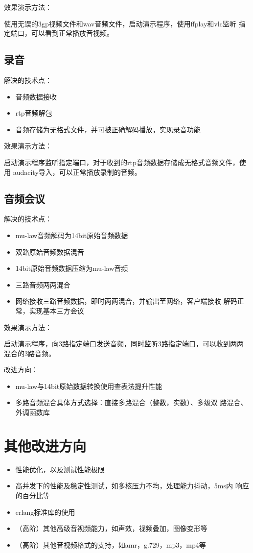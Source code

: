\documentclass[11pt]{article}
\begin{document}
    效果演示方法：
        
        使用无误的3gp视频文件和wav音频文件，启动演示程序，使用ffplay和vlc监听
        指定端口，可以看到正常播放音视频。

\subsection{录音}
    解决的技术点：
    \begin{itemize}
        \item 音频数据接收
        \item rtp音频解包
        \item 音频存储为无格式文件，并可被正确解码播放，实现录音功能
    \end{itemize}

    效果演示方法：
        
    启动演示程序监听指定端口，对于收到的rtp音频数据存储成无格式音频文件，使用
    audacity导入，可以正常播放录制的音频。

\subsection{音频会议}
    解决的技术点：
    \begin{itemize}
        \item mu-law音频解码为14bit原始音频数据
        \item 双路原始音频数据混音
        \item 14bit原始音频数据压缩为mu-law音频
        \item 三路音频两两混合
        \item 网络接收三路音频数据，即时两两混合，并输出至网络，客户端接收
              解码正常，实现基本三方会议
    \end{itemize}

    效果演示方法：
        
        启动演示程序，向3路指定端口发送音频，同时监听3路指定端口，可以收到两两
        混合的3路音频。


    改进方向：
    \begin{itemize}
        \item mu-law与14bit原始数据转换使用查表法提升性能
        \item 多路音频混合具体方式选择：直接多路混合（整数，实数）、多级双
              路混合、外调函数库
    \end{itemize}
\section{其他改进方向}
    \begin{itemize}
        \item 性能优化，以及测试性能极限
        \item 高并发下的性能及稳定性测试，如多核压力不均，处理能力抖动，5ms内
              响应的百分比等
        \item erlang标准库的使用
        \item （高阶）其他高级音视频能力，如声效，视频叠加，图像变形等
        \item （高阶）其他音视频格式的支持，如amr，g.729，mp3，mp4等
    \end{itemize}
\end{document}
